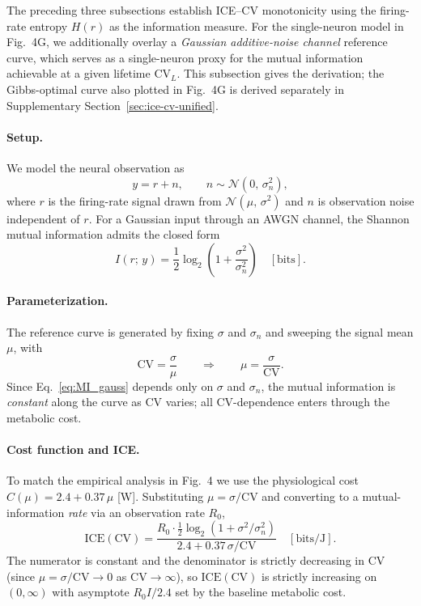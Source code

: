 \documentclass[11pt]{article}
\theoremstyle{remark}
\theoremstyle{definition}
\begin{document}
The preceding three subsections establish ICE--CV monotonicity using the firing-rate entropy $H(r)$ as the information measure.  For the single-neuron model in Fig.~4G, we additionally overlay a \emph{Gaussian additive-noise channel} reference curve, which serves as a single-neuron proxy for the mutual information achievable at a given lifetime $\mathrm{CV}_L$.  This subsection gives the derivation; the Gibbs-optimal curve also plotted in Fig.~4G is derived separately in Supplementary Section~\ref{sec:ice-cv-unified}.

\paragraph{Setup.}
We model the neural observation as
\begin{equation}
y = r + n, \qquad n \sim \mathcal{N}(0,\,\sigma_n^2),
\end{equation}
where $r$ is the firing-rate signal drawn from $\mathcal{N}(\mu,\,\sigma^2)$ and $n$ is observation noise independent of $r$.  For a Gaussian input through an AWGN channel, the Shannon mutual information admits the closed form
\begin{equation}
\label{eq:MI_gauss}
I(r;\,y) = \frac{1}{2}\log_2\!\left(1 + \frac{\sigma^2}{\sigma_n^2}\right) \quad [\text{bits}].
\end{equation}

\paragraph{Parameterization.}
The reference curve is generated by fixing $\sigma$ and $\sigma_n$ and sweeping the signal mean $\mu$, with
\begin{equation}
\text{CV} = \frac{\sigma}{\mu} \qquad \Longrightarrow \qquad \mu = \frac{\sigma}{\text{CV}}.
\end{equation}
Since Eq.~\eqref{eq:MI_gauss} depends only on $\sigma$ and $\sigma_n$, the mutual information is \emph{constant} along the curve as CV varies; all CV-dependence enters through the metabolic cost.

\paragraph{Cost function and ICE.}
To match the empirical analysis in Fig.~4 we use the physiological cost $C(\mu) = 2.4 + 0.37\,\mu$ [W].  Substituting $\mu = \sigma/\text{CV}$ and converting to a mutual-information \emph{rate} via an observation rate $R_0$,
\begin{equation}
\label{eq:ICE_gauss_channel}
\text{ICE}(\text{CV})
= \frac{R_0 \cdot \tfrac{1}{2}\log_2\!\left(1 + \sigma^2/\sigma_n^2\right)}
       {2.4 + 0.37\,\sigma/\text{CV}}
\quad [\text{bits/J}].
\end{equation}
The numerator is constant and the denominator is strictly decreasing in CV (since $\mu = \sigma/\text{CV} \to 0$ as $\text{CV}\to\infty$), so $\text{ICE}(\text{CV})$ is strictly increasing on $(0,\infty)$ with asymptote $R_0 I / 2.4$ set by the baseline metabolic cost.
\end{document}
